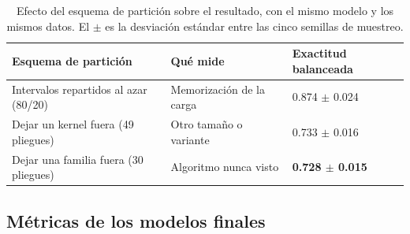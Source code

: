 \begin{table}[H]
\centering
\caption[Efecto del esquema de partición]{Efecto del esquema de partición sobre el resultado, con el mismo modelo y los mismos datos. El $\pm$ es la desviación estándar entre las cinco semillas de muestreo.}
\label{tab:cpu-protocolos}
\small
\setlength{\tabcolsep}{3pt}
\begin{tabular}{@{}p{5.8cm}p{4.1cm}p{3.6cm}@{}}
\toprule
\textbf{Esquema de partición} & \textbf{Qué mide} & \textbf{Exactitud balanceada} \\
\midrule
Intervalos repartidos al azar (80/20) & Memorización de la carga & 0.874 $\pm$ 0.024 \\
Dejar un kernel fuera (49 pliegues) & Otro tamaño o variante & 0.733 $\pm$ 0.016 \\
Dejar una familia fuera (30 pliegues) & Algoritmo nunca visto & \textbf{0.728 $\pm$ 0.015} \\
\bottomrule
\end{tabular}
\end{table}

\subsection{Métricas de los modelos finales}

